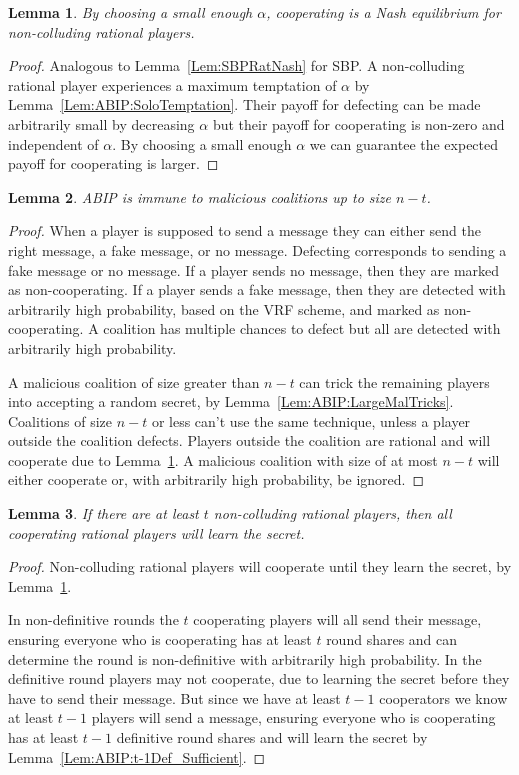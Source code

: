 \documentclass[12pt]{dalcsthesis}
\newtheorem{lemma}{Lemma}
\begin{document}
\begin{lemma}\label{Lem:ABIP:SoloNash}By choosing a small enough $\alpha$, cooperating is a Nash equilibrium for non-colluding rational players.\end{lemma}
\begin{proof}
Analogous to Lemma~\ref{Lem:SBPRatNash} for SBP. A non-colluding rational player experiences a maximum temptation of $\alpha$ by Lemma~\ref{Lem:ABIP:SoloTemptation}. Their payoff for defecting can be made arbitrarily small by decreasing $\alpha$ but their payoff for cooperating is non-zero and independent of $\alpha$. By choosing a small enough $\alpha$ we can guarantee the expected payoff for cooperating is larger.
\end{proof}

\begin{lemma}\label{Lem:ABIP:SmallMalImmune}ABIP is immune to malicious coalitions up to size $n-t$.\end{lemma}
\begin{proof}
When a player is supposed to send a message they can either send the right message, a fake message, or no message. Defecting corresponds to sending a fake message or no message. If a player sends no message, then they are marked as non-cooperating. If a player sends a fake message, then they are detected with arbitrarily high probability, based on the VRF scheme, and marked as non-cooperating. A coalition has multiple chances to defect but all are detected with arbitrarily high probability.

A malicious coalition of size greater than $n-t$ can trick the remaining players into accepting a random secret, by Lemma~\ref{Lem:ABIP:LargeMalTricks}. Coalitions of size $n-t$ or less can't use the same technique, unless a player outside the coalition defects. Players outside the coalition are rational and will cooperate due to Lemma~\ref{Lem:ABIP:SoloNash}. A malicious coalition with size of at most $n-t$ will either cooperate or, with arbitrarily high probability, be ignored.
\end{proof}

\begin{lemma}\label{Lem:ABIP:WorksForEnoughSoloRats}If there are at least $t$ non-colluding rational players, then all cooperating rational players will learn the secret.\end{lemma}
\begin{proof}
Non-colluding rational players will cooperate until they learn the secret, by Lemma~\ref{Lem:ABIP:SoloNash}.

In non-definitive rounds the $t$ cooperating players will all send their message, ensuring everyone who is cooperating has at least $t$ round shares and can determine the round is non-definitive with arbitrarily high probability. In the definitive round players may not cooperate, due to learning the secret before they have to send their message. But since we have at least $t-1$ cooperators we know at least $t-1$ players will send a message, ensuring everyone who is cooperating has at least $t-1$ definitive round shares and will learn the secret by Lemma~\ref{Lem:ABIP:t-1Def_Sufficient}. 
\end{proof}
\end{document}
